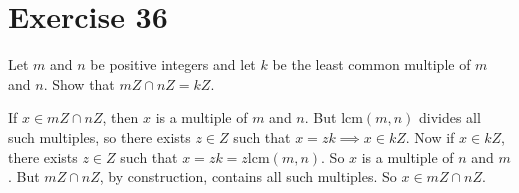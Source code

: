 \documentclass[12pt]{article}
\newcommand{\lcm}{\mbox{lcm}}
\begin{document}
\section*{Exercise 36}

Let $m$ and $n$ be positive integers and let $k$ be the least common multiple of $m$ and $n$.
Show that $mZ\cap nZ=kZ$.

If $x\in mZ\cap nZ$, then $x$ is a multiple of $m$ and $n$.  But $\lcm(m,n)$ divides
all such multiples, so there exists $z\in Z$ such that $x=zk\implies x\in kZ$.
Now if $x\in kZ$, there exists $z\in Z$ such that $x=zk=z\lcm(m,n)$.
So $x$ is a multiple of $n$ and $m$.  But $mZ\cap nZ$, by construction,
contains all such multiples.  So $x\in mZ\cap nZ$.
\end{document}
